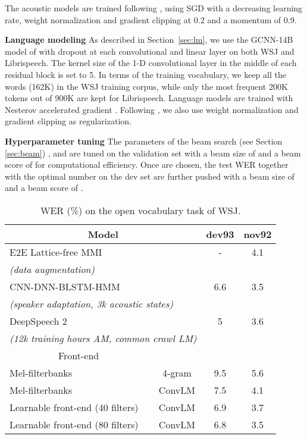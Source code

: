 \documentclass[a4paper]{article}
\begin{document}
The acoustic models are trained following \cite{wav2letter2,tdfbanks2}, using SGD with a decreasing learning rate, weight normalization and gradient clipping at 0.2 and a momentum of 0.9.

{\bf Language modeling} As described in Section~\ref{sec:lm}, we use the GCNN-14B model of \cite{glu} with dropout at each convolutional and linear layer on both WSJ and Librispeech. The kernel size of the 1-D convolutional layer in the middle of each residual block is set to 5. In terms of the training vocabulary, we keep all the words (162K) in the WSJ training corpus, while only the most frequent 200K tokens out of 900K are kept for Librispeech. 
Language models are trained with Nesterov accelerated gradient \cite{nag}. Following \cite{glu}, we also use weight normalization and gradient clipping as regularization.

{\bf Hyperparameter tuning}
The parameters of the beam search (see Section \ref{sec:beam}) ,  and  are tuned on the validation set with a beam size of  and a beam score of  for computational efficiency. Once  are chosen, the test WER together with the optimal number on the dev set are further pushed with a beam size of  and a beam score of .



\begingroup
\setlength{\tabcolsep}{3pt}
\begin{table}[]
    \centering
\begin{tabular}{lcccc} \toprule
\multicolumn{3}{c}{Model}&dev93&nov92\\
\midrule
\multicolumn{3}{l}{E2E Lattice-free MMI \cite{latticefreemmi}} & - & 4.1\\
\multicolumn{3}{l}{\small \emph{(data augmentation)}}& & \\
\multicolumn{3}{l}{CNN-DNN-BLSTM-HMM \cite{chan2015deep}}&6.6&3.5\\
\multicolumn{3}{l}{\small \emph{(speaker adaptation, 3k acoustic states)}}& &\\
\multicolumn{3}{l}{DeepSpeech 2 \cite{deepspeech2}}&5&3.6\\
\multicolumn{3}{l}{\small \emph{(12k training hours AM, common crawl LM)}}& &\\
\midrule
\multicolumn{2}{c}{Front-end}&{\centering{LM}}&&\\
\cmidrule{1-3}\multicolumn{2}{l}{Mel-filterbanks} & 4-gram & 9.5 & 5.6 \\
\multicolumn{2}{l}{Mel-filterbanks} & ConvLM &7.5 &4.1\\
\multicolumn{2}{l}{Learnable front-end (40 filters)} & ConvLM &6.9 &3.7\\
\multicolumn{2}{l}{Learnable front-end (80 filters)} & ConvLM &6.8&3.5\\
\bottomrule
\end{tabular}
   \caption{WER (\%) on the open vocabulary task of WSJ.}
    \label{tab:wsj}
\vspace{-4mm}
\end{table}
\endgroup
\end{document}
